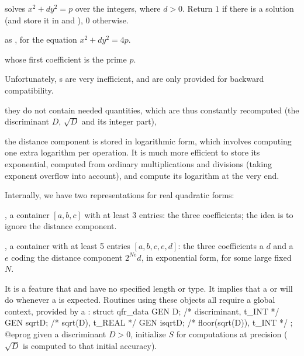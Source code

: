  solves
$x^2+ dy^2 = p$ over the integers, where $d > 0$. Return $1$ if there is a
solution (and store it in  and ), $0$ otherwise.

 as ,
for the equation $x^2 + dy^2 = 4p$.


  whose first coefficient
is the prime $p$.


 Unfortunately, s
are very inefficient, and are only provided for backward compatibility.

\item they do not contain needed quantities, which are thus constantly
recomputed (the discriminant $D$, $\sqrt{D}$ and its integer part),

\item the distance component is stored in logarithmic form, which involves
computing one extra logarithm per operation. It is much more efficient
to store its exponential, computed from ordinary multiplications and
divisions (taking exponent overflow into account), and compute its logarithm
at the very end.

Internally, we have two representations for real quadratic forms:

\item {}, a container $[a,b,c]$ with at least 3 entries: the three
coefficients; the idea is to ignore the distance component.

\item {}, a container with at least 5 entries $[a,b,c,e,d]$: the
three coefficients a  $d$ and a  $e$ coding the distance
component $2^{Ne} d$, in exponential form, for some large fixed $N$.

It is a feature that  and  have no specified length or
type. It implies that a  or  will do whenever a 
is expected. Routines using these objects all require a global context,
provided by a :
\bprog
  struct qfr_data {
    GEN D;        /* discriminant, t_INT   */
    GEN sqrtD;    /* sqrt(D), t_REAL       */
    GEN isqrtD;   /* floor(sqrt(D)), t_INT */
  };
@eprog
given a discriminant $D > 0$, initialize $S$ for computations at precision
 ($\sqrt{D}$ is computed to that initial accuracy).

